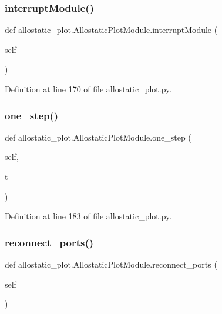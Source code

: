 \subsubsection{\texorpdfstring{interrupt\+Module()}{interruptModule()}}
{\footnotesize\ttfamily def allostatic\+\_\+plot.\+Allostatic\+Plot\+Module.\+interrupt\+Module (\begin{DoxyParamCaption}\item[{}]{self }\end{DoxyParamCaption})}



Definition at line 170 of file allostatic\+\_\+plot.\+py.

\mbox{\label{classallostatic__plot_1_1AllostaticPlotModule_a7e391f34e1880a38b47f83a40ba71a12}} 
\subsubsection{\texorpdfstring{one\+\_\+step()}{one\_step()}}
{\footnotesize\ttfamily def allostatic\+\_\+plot.\+Allostatic\+Plot\+Module.\+one\+\_\+step (\begin{DoxyParamCaption}\item[{}]{self,  }\item[{}]{t }\end{DoxyParamCaption})}



Definition at line 183 of file allostatic\+\_\+plot.\+py.

\mbox{\label{classallostatic__plot_1_1AllostaticPlotModule_ae588cd72041118c2612d1cad8a981d88}} 
\subsubsection{\texorpdfstring{reconnect\+\_\+ports()}{reconnect\_ports()}}
{\footnotesize\ttfamily def allostatic\+\_\+plot.\+Allostatic\+Plot\+Module.\+reconnect\+\_\+ports (\begin{DoxyParamCaption}\item[{}]{self }\end{DoxyParamCaption})}



